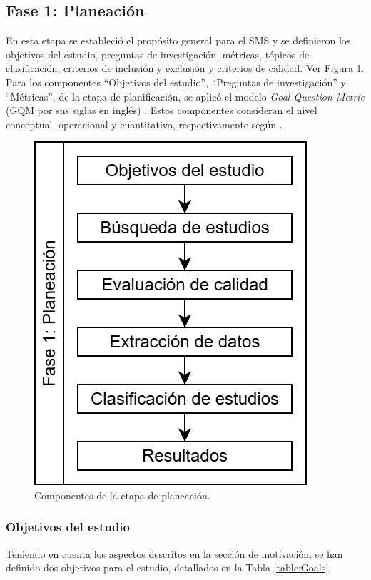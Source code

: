 \subsection{Fase 1: Planeación}\label{sec:planeacion}
En esta etapa se estableció el propósito general para el SMS y se definieron los objetivos del estudio, preguntas de investigación, métricas, tópicos de clasificación, criterios de inclusión y exclusión y criterios de calidad. Ver Figura \ref{fig:PlanningStageOverview}.
Para los componentes ``Objetivos del estudio'', ``Preguntas de investigación'' y ``Métricas'', de la etapa de planificación, se aplicó el modelo {\itshape Goal-Question-Metric} (GQM por sus siglas en inglés) \cite{basili1992software, caldiera1994goal}. Estos componentes consideran el nivel conceptual, operacional y cuantitativo, respectivamente según \cite{Sepúlveda202141}.

\begin{figure}[htbp]
	\centering
	\includegraphics[scale=0.4]{resources/figures/sms-Etapa-1 overview.drawio.png}
	\caption{Componentes de la etapa de planeación.}
	\label{fig:PlanningStageOverview}
\end{figure}

\subsubsection{Objetivos del estudio}
Teniendo en cuenta los aspectos descritos en la sección de motivación, se han definido dos objetivos para el estudio, detallados en la Tabla \ref{table:Goals}.

